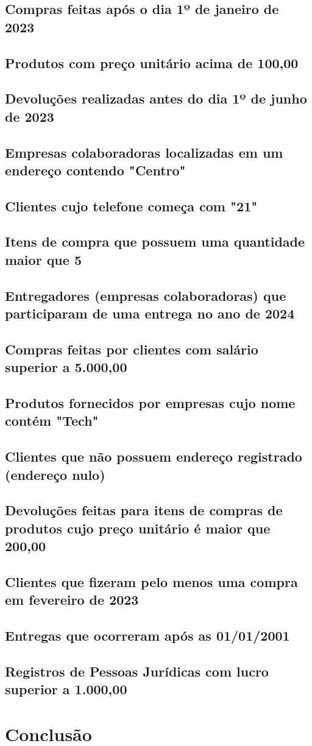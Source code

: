 \documentclass[12pt,a4paper]{article}
\begin{document}
\subsection{Compras feitas após o dia 1º de janeiro de 2023}
\subsection{Produtos com preço unitário acima de 100,00}
\subsection{Devoluções realizadas antes do dia 1º de junho de 2023}
\subsection{Empresas colaboradoras localizadas em um endereço contendo "Centro"}
\subsection{Clientes cujo telefone começa com "21"}
\subsection{Itens de compra que possuem uma quantidade maior que 5}
\subsection{Entregadores (empresas colaboradoras) que participaram de uma entrega no ano de 2024}
\subsection{Compras feitas por clientes com salário superior a 5.000,00}
\subsection{Produtos fornecidos por empresas cujo nome contém "Tech"}
\subsection{Clientes que não possuem endereço registrado (endereço nulo)}
\subsection{Devoluções feitas para itens de compras de produtos cujo preço unitário é maior que 200,00}
\subsection{Clientes que fizeram pelo menos uma compra em fevereiro de 2023}
\subsection{Entregas que ocorreram após as 01/01/2001}
\subsection{Registros de Pessoas Jurídicas com lucro superior a 1.000,00}

\newpage
\section{Conclusão}
\end{document}

